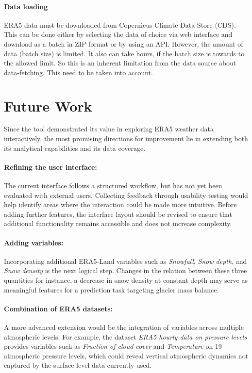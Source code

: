 \paragraph{Data loading}
ERA5 data must be downloaded from Copernicus Climate Data Store (CDS)\parencite{era5_single_levels}. This can be done either by selecting the data of choice via web interface and download as a batch in ZIP format or by using an API. However, the amount of data (batch size) is limited. It also can take hours, if the batch size is towards to the allowed limit. So this is an inherent limitation from the data source about data-fetching. This need to be taken into account.



\section{Future Work}
Since the tool demonstrated its value in exploring ERA5 weather data
interactively, the most promising directions for improvement lie in extending
both its analytical capabilities and its data coverage.

\paragraph{Refining the user interface:}
The current interface follows a structured workflow, but has not yet been evaluated with external users. Collecting feedback through usability testing would help identify areas where the interaction could be made more intuitive.
Before adding further features, the interface layout should be revised to ensure that additional functionality remains accessible and does not increase complexity.

\paragraph{Adding variables:}
Incorporating additional ERA5-Land variables such as \textit{Snowfall},
\textit{Snow depth}, and \textit{Snow density} is the next logical step. Changes in the relation between these three quantities for instance, a decrease in snow density at constant depth may serve as meaningful features
for a prediction task targeting glacier mass balance.

\paragraph{Combination of ERA5 datasets:}
A more advanced extension would be the integration of variables across
multiple atmospheric levels. For example, the dataset \textit{ERA5 hourly data on pressure levels} provides variables such as \textit{Fraction of cloud cover}
and \textit{Temperature} on 19 atmospheric pressure levels, which could reveal vertical atmospheric dynamics not captured by the surface-level data currently used.


